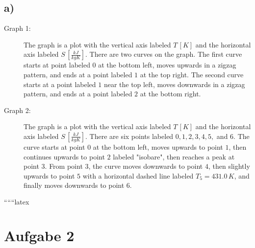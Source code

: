 

\subsection*{a)}

\begin{description}
    \item[Graph 1:] The graph is a plot with the vertical axis labeled \( T \, [K] \) and the horizontal axis labeled \( S \, \left[ \frac{kJ}{kgK} \right] \). There are two curves on the graph. The first curve starts at point labeled \( 0 \) at the bottom left, moves upwards in a zigzag pattern, and ends at a point labeled \( 1 \) at the top right. The second curve starts at a point labeled \( 1 \) near the top left, moves downwards in a zigzag pattern, and ends at a point labeled \( 2 \) at the bottom right.
    
    \item[Graph 2:] The graph is a plot with the vertical axis labeled \( T \, [K] \) and the horizontal axis labeled \( S \, \left[ \frac{kJ}{kgK} \right] \). There are six points labeled \( 0, 1, 2, 3, 4, 5, \) and \( 6 \). The curve starts at point \( 0 \) at the bottom left, moves upwards to point \( 1 \), then continues upwards to point \( 2 \) labeled "isobare", then reaches a peak at point \( 3 \). From point \( 3 \), the curve moves downwards to point \( 4 \), then slightly upwards to point \( 5 \) with a horizontal dashed line labeled \( T_5 = 431.0 \, K \), and finally moves downwards to point \( 6 \).
\end{description}

``````latex


\section*{Aufgabe 2}